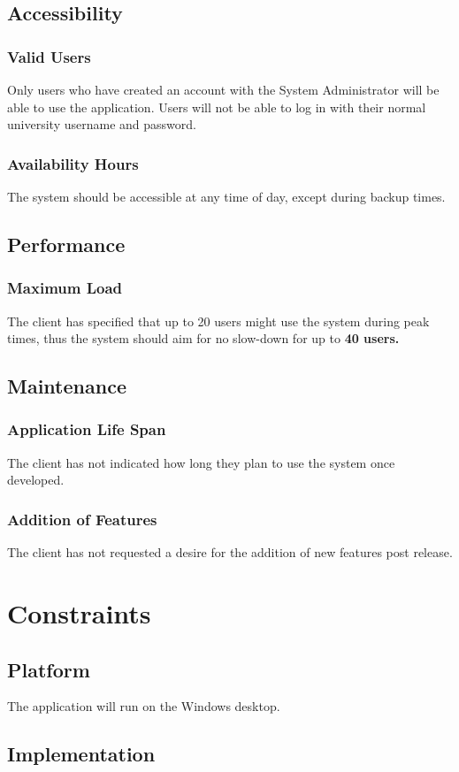 \documentclass{article}
\begin{document}
\subsection{Accessibility}
\subsubsection{Valid Users}
Only users who have created an account with the System Administrator will be able
to use the application. Users will not be able to log in with their normal
university username and password.
\subsubsection{Availability Hours}
The system should be accessible at any time of day, except during backup times.
\subsection{Performance}
\subsubsection{Maximum Load}
The client has specified that up to 20 users might use the system during
peak times, thus the system should aim for no slow-down for up to \textbf{40 users.}
\subsection{Maintenance}
\subsubsection{Application Life Span}
The client has not indicated how long they plan to use the system once developed.
\subsubsection{Addition of Features}
The client has not requested a desire for the addition of new
features post release.

\section{Constraints}
\subsection{Platform}
The application will run on the Windows desktop.
\subsection{Implementation}
\end{document}
